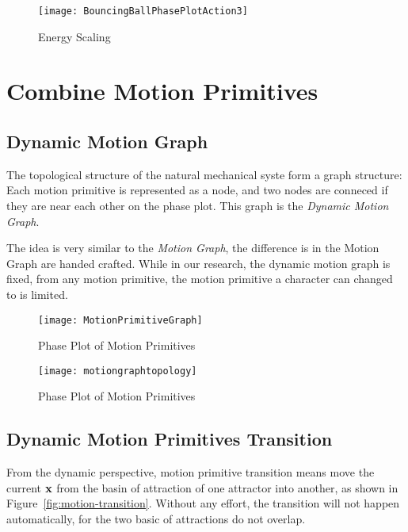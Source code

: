 \begin{figure}[!htbp]
  \begin{center}
	\texttt{[image: BouncingBallPhasePlotAction3]}
    \caption{Energy Scaling}
    \label{fig:energy3}
  \end{center}
\end{figure}

\section{Combine Motion Primitives}

\subsection{Dynamic Motion Graph}
The topological structure of the natural mechanical syste form a graph structure:
Each motion primitive is represented as a node, and two nodes are conneced if they are near each other on the phase plot.
This graph is the \emph{Dynamic Motion Graph}.

The idea is very similar to the \emph{Motion Graph}\citep{kovar2008motion}, the difference is in the  Motion Graph are handed crafted.
While in our research,  the dynamic motion graph is fixed, from any motion primitive, the motion primitive a character can changed to is limited.

\begin{figure}[!htbp]
  \begin{center}
	\texttt{[image: MotionPrimitiveGraph]}
    \caption{Phase Plot of Motion Primitives}
    \label{fig:manyprimitives}
  \end{center}
\end{figure}


\begin{figure}[!htbp]
  \begin{center}
      \texttt{[image: motiongraphtopology]}
    \caption{Phase Plot of Motion Primitives}
    \label{fig:manyprimitives}
  \end{center}
\end{figure}


\subsection{Dynamic Motion Primitives Transition}
From  the dynamic perspective, motion primitive transition means move the current $\mathbf{x}$ from the basin of attraction of one attractor into another, as shown in Figure~\ref{fig:motion-transition}.
Without any effort, the transition will not happen automatically, for the two basic of attractions do not overlap.



